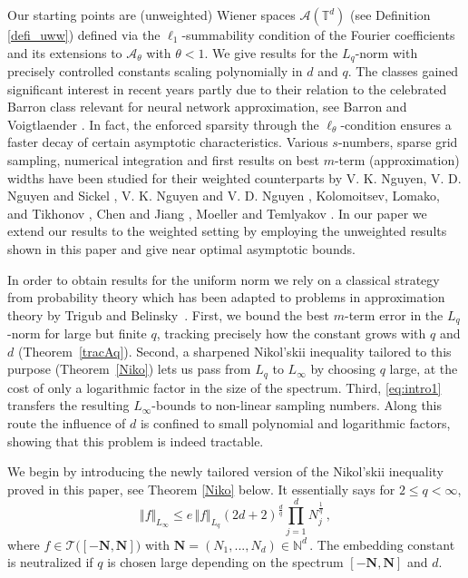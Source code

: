 \documentclass[11pt,reqno]{article}
\numberwithin{equation}{section}
\theoremstyle{definition}
\theoremstyle{plain}
\newcommand{\tor}{\ensuremath{\mathbb{T}}}
\newcommand{\ca}{\ensuremath{\mathcal A}}
\newcommand{\bN}{\ensuremath{\mathbf N}}
\newcommand{\be}{\begin{equation}}
\newcommand{\ee}{\end{equation}}
\begin{document}
Our starting points are (unweighted) Wiener spaces $\mathcal{A}(\tor^d)$ (see Definition \ref{defi_uww}) defined via the $\ell_1$-summability condition of the Fourier coefficients and its extensions to $\ca_\theta$ with $\theta<1$. We give results for the $L_q$-norm with precisely controlled constants scaling polynomially in $d$ and $q$. The classes gained significant interest in recent years  partly due to their relation to the celebrated Barron class relevant for neural network approximation, see  Barron \cite{Ba93, Ba94} and Voigtlaender \cite{Vo22}. In fact, the enforced sparsity through the $\ell_\theta$-condition ensures a faster decay of certain asymptotic characteristics. Various \(s\)-numbers, sparse grid sampling, numerical integration and first results on best \(m\)-term (approximation) widths have been studied for their weighted counterparts by V. K. Nguyen, V. D. Nguyen and Sickel \cite{NNS22}, V. K. Nguyen and V. D. Nguyen \cite{NN22}, Kolomoitsev, Lomako, and Tikhonov \cite{KoLoTi23}, Chen and Jiang \cite{ChenJiang24}, Moeller \cite{Mo23} and Temlyakov \cite{Te23}. In our paper \cite{MSU25} we extend our results to the weighted setting by employing the unweighted results shown in this paper and give near optimal asymptotic bounds.

In order to obtain results for the uniform norm we rely on a classical strategy from probability theory which has been adapted to problems in approximation theory by Trigub and Belinsky~\cite[Theorem 11.2.4]{TrBe04}. First, we bound the best $m$-term error in the $L_q$-norm for large but finite $q$, tracking precisely how the constant grows with $q$ and $d$ (Theorem~\ref{tracAq}). Second, a sharpened Nikol'skii inequality tailored to this purpose (Theorem~\ref{Niko}) lets us pass from $L_q$ to $L_\infty$ by choosing $q$ large, at the cost of only a logarithmic factor in the size of the spectrum. Third, \eqref{eq:intro1} transfers the resulting $L_\infty$-bounds to non-linear sampling numbers. Along this route the influence
of $d$ is confined to small polynomial and logarithmic factors, showing that this problem is indeed tractable.

We begin by introducing the newly tailored version of the Nikol'skii inequality proved in this paper, see Theorem \ref{Niko} below. It essentially says for $2\leq q<\infty$,
\be\label{intr1}
\Vert f \Vert_{L_\infty} \leq e\, \Vert f \Vert_{L_q} (2d+2)^{\frac{d}{q}} \prod_{j=1}^d N_j^{\frac{1}{q}}\,,
\ee
where $f\in \mathcal{T}\big([-\bN,\bN]\big)$ with $\bN = (N_1,...,N_d) \in \mathbb{N}^d$\,. The embedding constant is neutralized if $q$ is chosen large depending on the spectrum $[-\bN,\bN]$ and $d$.
\end{document}
